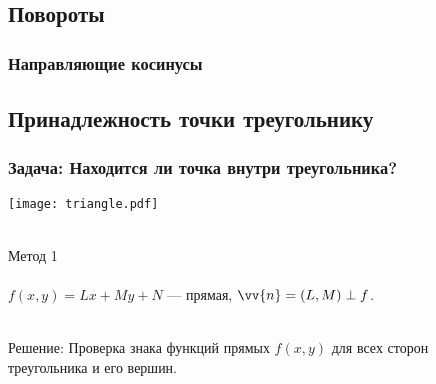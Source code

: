 \documentclass[10pt]{beamer}
\begin{document}
\subsection{Повороты}

\begin{frame}\frametitle{Направляющие косинусы}
{
}
\end{frame}

\subsection{Принадлежность точки треугольнику}

\begin{frame}\frametitle {Задача: Находится ли точка внутри треугольника?}
{
	{
		\texttt{[image: triangle.pdf]} \\ ~ \\
	}
	{
		Метод 1 \\ ~ \\
		
		$f(x,y)=Lx+My+N$ --- прямая, $\vv{n}=(L,M) \perp f$. \\ ~ \\
		
		\pause
		
		Решение: Проверка знака функций прямых $f(x,y)$ для всех сторон треугольника и его вершин.
	}
}
\end{frame}
\end{document}
